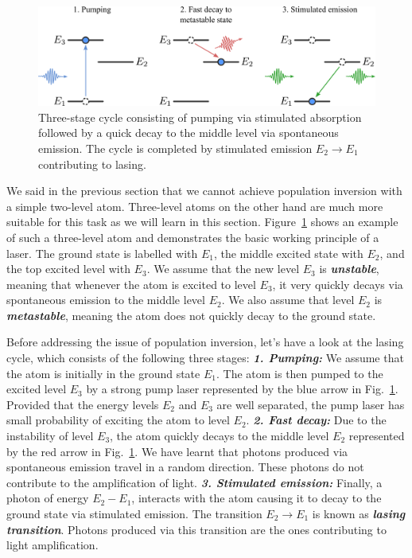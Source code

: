 \begin{figure}[t]
    \centering
    \includegraphics[width=\textwidth]{lesson5/5-4_three-level-atom.pdf}
    \caption[Laser cycle]{Three-stage cycle consisting of pumping via stimulated absorption followed by a quick decay to the middle level via spontaneous emission. The cycle is completed by stimulated emission $E_2 \rightarrow E_1$ contributing to lasing.}
    \label{fig:5-4_three_level_atom}
\end{figure}

We said in the previous section that we cannot achieve population inversion with a simple two-level atom.
Three-level atoms on the other hand are much more suitable for this task as we will learn in this section.
Figure~\ref{fig:5-4_three_level_atom} shows an example of such a three-level atom and demonstrates the basic working principle of a laser.
The ground state is labelled with $E_1$, the middle excited state with $E_2$, and the top excited level with $E_3$.
We assume that the new level $E_3$ is \textit{\textbf{unstable}}, meaning that whenever the atom is excited to level $E_3$, it very quickly decays via spontaneous emission to the middle level $E_2$.
We also assume that level $E_2$ is \textit{\textbf{metastable}}, meaning the atom does not quickly decay to the ground state.

Before addressing the issue of population inversion, let's have a look at the lasing cycle, which consists of the following three stages:
\newline
\textit{\textbf{1. Pumping:}}
We assume that the atom is initially in the ground state $E_1$.
The atom is then pumped to the excited level $E_3$ by a strong pump laser represented by the blue arrow in Fig.~\ref{fig:5-4_three_level_atom}.
Provided that the energy levels $E_2$ and $E_3$ are well separated, the pump laser has small probability of exciting the atom to level $E_2$.
\newline
\textit{\textbf{2. Fast decay:}}
Due to the instability of level $E_3$, the atom quickly decays to the middle level $E_2$ represented by the red arrow in Fig.~\ref{fig:5-4_three_level_atom}.
We have learnt that photons produced via spontaneous emission travel in a random direction.
These photons do not contribute to the amplification of light.
\newline
\textit{\textbf{3. Stimulated emission:}}
Finally, a photon of energy $E_2-E_1$, interacts with the atom causing it to decay to the ground state via stimulated emission.
The transition $E_2\rightarrow E_1$ is known as \textit{\textbf{lasing transition}}.
Photons produced via this transition are the ones contributing to light amplification.

